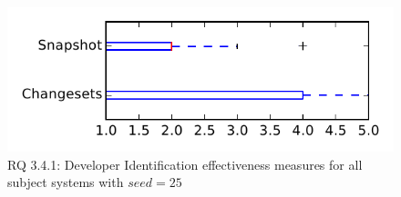 
\begin{figure}
\centering
\includegraphics[height=0.4\textheight]{figures/dit_seed/rq1_tiny_25}
\caption{RQ 3.4.1: Developer Identification effectiveness measures for all subject systems with $seed=25$}
\label{fig:dit_seed:rq1:tiny}
\end{figure}
